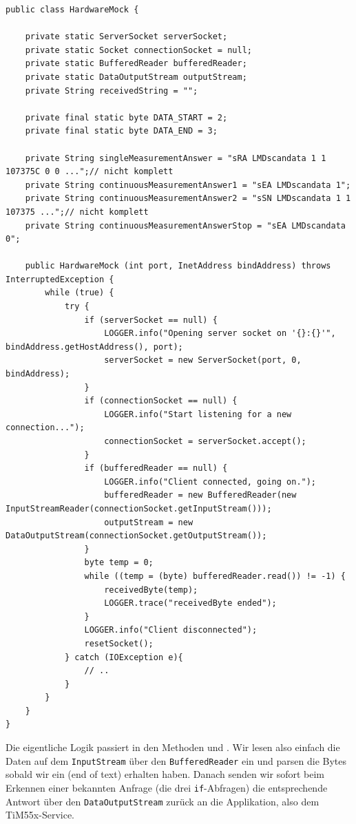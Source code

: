 \begin{lstlisting}
public class HardwareMock {

    private static ServerSocket serverSocket;
    private static Socket connectionSocket = null;
    private static BufferedReader bufferedReader;
    private static DataOutputStream outputStream;
    private String receivedString = "";

    private final static byte DATA_START = 2;
    private final static byte DATA_END = 3;

    private String singleMeasurementAnswer = "sRA LMDscandata 1 1 107375C 0 0 ...";// nicht komplett
    private String continuousMeasurementAnswer1 = "sEA LMDscandata 1";
    private String continuousMeasurementAnswer2 = "sSN LMDscandata 1 1 107375 ...";// nicht komplett
    private String continuousMeasurementAnswerStop = "sEA LMDscandata 0";

    public HardwareMock (int port, InetAddress bindAddress) throws InterruptedException {
        while (true) {
            try {
                if (serverSocket == null) {
                    LOGGER.info("Opening server socket on '{}:{}'", bindAddress.getHostAddress(), port);
                    serverSocket = new ServerSocket(port, 0, bindAddress);
                }
                if (connectionSocket == null) {
                    LOGGER.info("Start listening for a new connection...");
                    connectionSocket = serverSocket.accept();
                }
                if (bufferedReader == null) {
                    LOGGER.info("Client connected, going on.");
                    bufferedReader = new BufferedReader(new InputStreamReader(connectionSocket.getInputStream()));
                    outputStream = new DataOutputStream(connectionSocket.getOutputStream());
                }
                byte temp = 0;
                while ((temp = (byte) bufferedReader.read()) != -1) {
                    receivedByte(temp);
                    LOGGER.trace("receivedByte ended");
                }
                LOGGER.info("Client disconnected");
                resetSocket();
            } catch (IOException e){
                // ..
            }
        }
    }
}
\end{lstlisting}
Die eigentliche Logik passiert in den Methoden  und . Wir lesen also einfach die Daten auf dem \texttt{InputStream} über den \texttt{BufferedReader} ein und parsen die Bytes sobald wir ein  (end of text) erhalten haben. Danach senden wir sofort beim Erkennen einer bekannten Anfrage (die drei \texttt{if}-Abfragen) die entsprechende Antwort über den \texttt{DataOutputStream} zurück an die Applikation, also dem TiM55x-Service.
